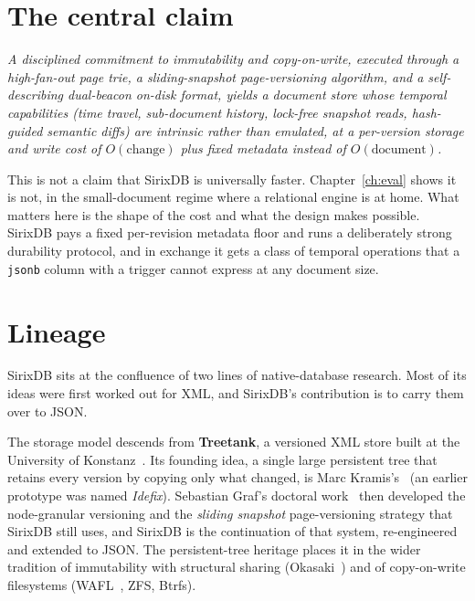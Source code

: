 \documentclass[11pt,a4paper,oneside]{report}
\theoremstyle{sirixthm}
\newcommand{\code}[1]{\texttt{#1}}
\begin{document}
\section{The central claim}

\begin{thesisbox}
\itshape A disciplined commitment to immutability and copy-on-write, executed through a
high-fan-out page trie, a sliding-snapshot page-versioning algorithm, and a
self-describing dual-beacon on-disk format, yields a document store whose temporal
capabilities (time travel, sub-document history, lock-free snapshot reads, hash-guided
semantic diffs) are intrinsic rather than emulated, at a per-version storage and write
cost of $O(\text{change})$ plus fixed metadata instead of $O(\text{document})$.
\end{thesisbox}

This is not a claim that SirixDB is universally faster. Chapter~\ref{ch:eval} shows it is
not, in the small-document regime where a relational engine is at home. What matters here
is the shape of the cost and what the design makes possible. SirixDB pays a fixed
per-revision metadata floor and runs a deliberately strong durability protocol, and in
exchange it gets a class of temporal operations that a \code{jsonb} column with a trigger
cannot express at any document size.

\section{Lineage}

SirixDB sits at the confluence of two lines of native-database research. Most of its ideas were first
worked out for XML, and SirixDB's contribution is to carry them over to JSON.

The storage model descends from \textbf{Treetank}, a versioned XML store built at the University of
Konstanz~\cite{treetank}. Its founding idea, a single large persistent tree that retains every version
by copying only what changed, is Marc Kramis's~\cite{kramis} (an earlier prototype was named
\emph{Idefix}). Sebastian Graf's doctoral work~\cite{graf} then developed the node-granular versioning
and the \emph{sliding snapshot} page-versioning strategy that SirixDB still uses, and SirixDB is the
continuation of that system, re-engineered and extended to JSON. The persistent-tree heritage places it
in the wider tradition of immutability with structural sharing (Okasaki~\cite{okasaki}) and of
copy-on-write filesystems (WAFL~\cite{wafl}, ZFS, Btrfs).
\end{document}

